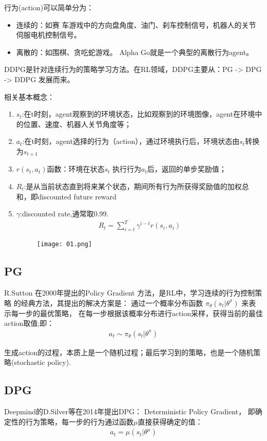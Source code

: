 \documentclass[12pt]{article}
\begin{document}
行为(action)可以简单分为：
\begin{itemize}
	\item 连续的：如赛 车游戏中的方向盘角度、油门、刹车控制信号，机器人的关节伺服电机控制信号。
	\item 离散的：如围棋、贪吃蛇游戏。 Alpha Go就是一个典型的离散行为agent。
\end{itemize}

DDPG是针对连续行为的策略学习方法。在RL领域，DDPG主要从：PG -> DPG -> DDPG 发展而来。

相关基本概念：
\begin{enumerate}
	\item $s_t$:在t时刻，agent观察到的环境状态，比如观察到的环境图像，agent在环境中的位置、速度、机器人关节角度等；
	\item $a_t$:在t时刻，agent选择的行为（action），通过环境执行后，环境状态由$s_t$转换为$s_{t+1}$
	\item $r(s_t,a_t)$函数：环境在状态$s_{t}$ 执行行为$a_t$后，返回的单步奖励值；
	\item $R_t$:是从当前状态直到将来某个状态，期间所有行为所获得奖励值的加权总和，即discounted future reward
	\item $\gamma$:discounted rate,通常取0.99.
	\begin{align}
		R_t=\sum_{i=t}^T\gamma^{i-t}r(s_i,a_i)
	\end{align}
	\begin{figure}[htbp]
		\centering
		\texttt{[image: 01.png]}
	\end{figure}
\end{enumerate}

\subsection{PG}
R.Sutton 在2000年提出的Policy Gradient 方法，是RL中，学习连续的行为控制策略
的经典方法，其提出的解决方案是：
通过一个概率分布函数 $ \pi_{\theta}(s_{t} | \theta^{\pi})$ 来表示每一步的最优策略，
在每一步根据该概率分布进行action采样，获得当前的最佳action取值;即：
\begin{align}
	a_t \sim \pi_{\theta}(s_{t} | \theta^{\pi})
\end{align}


生成action的过程，本质上是一个随机过程；最后学习到的策略，也是一个随机策略(stochastic policy).


\subsection{DPG}
Deepmind的D.Silver等在2014年提出DPG： Deterministic Policy Gradient，
 即确定性的行为策略，每一步的行为通过函数$\mu$直接获得确定的值：
 \begin{align}
	a_t=\mu(s_t|\theta^\mu)
 \end{align}
\end{document}
